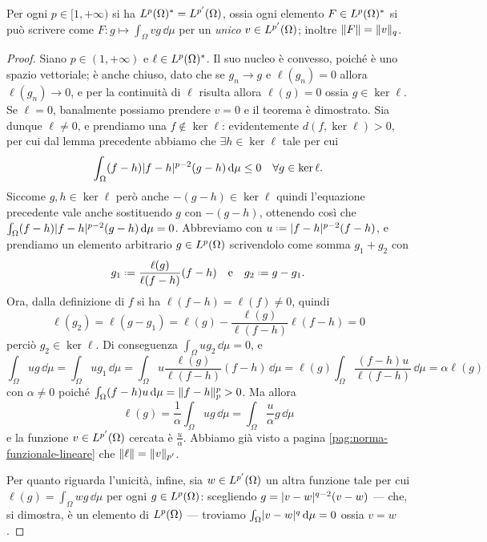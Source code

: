 \begin{teorema} \label{t:duale-Lp}
    Per ogni $p\in[1,+\infty)$ si ha $\dual{\leb[p]{\Omega}}=\leb[p']{\Omega}$, ossia ogni elemento $F\in\dual{\leb[p]{\Omega}}$ si può scrivere come $F\colon g\mapsto\int_\Omega vg\,\dd\mu$ per un \emph{unico} $v\in\leb[p']{\Omega}$; inoltre $\norm{F}=\norm{v}_q$.
\end{teorema}
\begin{proof}
    Siano $p\in(1,+\infty)$ e $\ell\in\dual{\leb[p]{\Omega}}$.
    Il suo nucleo è convesso, poich\'e è uno spazio vettoriale; è anche chiuso, dato che se $g_n\to g$ e $\ell(g_n)=0$ allora $\ell(g_n)\to 0$, e per la continuità di $\ell$ risulta allora $\ell(g)=0$ ossia $g\in\ker\ell$.
    Se $\ell=0$, banalmente possiamo prendere $v=0$ e il teorema è dimostrato.
    Sia dunque $\ell\ne 0$, e prendiamo una $f\notin\ker\ell$: evidentemente $d(f,\ker\ell)>0$, per cui dal lemma precedente abbiamo che $\exists h\in\ker\ell$ tale per cui
    \begin{equation}
        \int_\Omega (f-h)\abs{f-h}^{p-2}(g-h)\,\dd\mu\le 0\quad\forall g\in\ker\ell.
    \end{equation}
    Siccome $g,h\in\ker\ell$ però anche $-(g-h)\in\ker\ell$ quindi l'equazione precedente vale anche sostituendo $g$ con $-(g-h)$, ottenendo cos\`i che $\int_\Omega(f-h)\abs{f-h}^{p-2}(g-h)\,\dd\mu=0$.
    Abbreviamo con $u\defeq\abs{f-h}^{p-2}(f-h)$, e prendiamo un elemento arbitrario $g\in\leb[p]{\Omega}$ scrivendolo come somma $g_1+g_2$ con
    \begin{equation}
        g_1\defeq\frac{\ell(g)}{\ell(f-h)}(f-h)
        \qtext{e}
        g_2\defeq g-g_1.
    \end{equation}
    Ora, dalla definizione di $f$ si ha $\ell(f-h)=\ell(f)\ne 0$, quindi
    \begin{equation}
        \ell(g_2)=
        \ell(g-g_1)=
        \ell(g)-\frac{\ell(g)}{\ell(f-h)}\ell(f-h)=
        0
    \end{equation}
    perciò $g_2\in\ker\ell$.
    Di conseguenza $\int_\Omega ug_2\,\dd\mu=0$, e
    \begin{equation}
        \int_\Omega ug\,\dd\mu=
        \int_\Omega ug_1\,\dd\mu=
        \int_\Omega u\frac{\ell(g)}{\ell(f-h)}(f-h)\,\dd\mu=
        \ell(g)\int_\Omega \frac{(f-h)u}{\ell(f-h)}\,\dd\mu=
        \alpha\ell(g)
    \end{equation}
    con $\alpha\ne 0$ poich\'e $\int_\Omega (f-h)u\,\dd\mu=\norm{f-h}_p^p>0$.
    Ma allora
    \begin{equation}
        \ell(g)=
        \frac1{\alpha}\int_\Omega ug\,\dd\mu=
        \int_\Omega\frac{u}{\alpha}g\,\dd\mu
    \end{equation}
    e la funzione $v\in\leb[p']{\Omega}$ cercata è $\frac{u}{\alpha}$.
    Abbiamo già visto a pagina \ref{pag:norma-funzionale-lineare} che $\norm{\ell}=\norm{v}_{p'}$.

    Per quanto riguarda l'unicità, infine, sia $w\in\leb[p']{\Omega}$ un altra funzione tale per cui $\ell(g)=\int_\Omega wg\,\dd\mu$ per ogni $g\in\leb[p]{\Omega}$: scegliendo $g=\abs{v-w}^{q-2}(v-w)$ --- che, si dimostra, è un elemento di $\leb[p]{\Omega}$ --- troviamo $\int_\Omega \abs{v-w}^q\,\dd\mu=0$ ossia $v=w$.
\end{proof}
